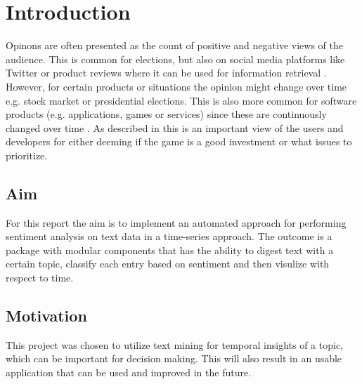 \chapter{Introduction}
\label{cha:introduction}


Opinons are often presented as the count of positive and negative views of the audience. This is common for elections, 
but also on social media platforms like Twitter or product reviews where it can be used for information retrieval \cite{twitter_mining}. 
However, for certain products or situations the opinion might change over time e.g. stock market or presidential elections. 
This is also more common for software products (e.g. applications, games or services) since these are continuously changed over time \cite{steam_reviews}.
As described in \cite{steam_reviews} this is an important view of the users and developers for either deeming if the game is a good investment or what 
issues to prioritize.


\section{Aim}
\label{sec:aim}

For this report the aim is to implement an automated approach for performing sentiment analysis on text data in a time-series approach. The outcome is a 
package with modular components that has the ability to digest text with a certain topic, classify each entry based on sentiment and then visulize with respect to time.


\section{Motivation}
\label{sec:motivation}

This project was chosen to utilize text mining for temporal insights of a topic, which can be important for decision making. This will also result in an usable application 
that can be used and improved in the future. 
